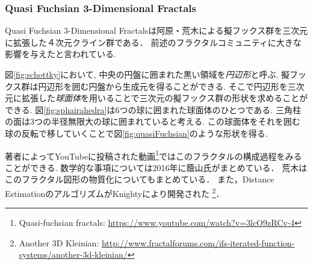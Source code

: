 \subsubsection{Quasi Fuchsian 3-Dimensional Fractals}

Quasi Fuchsian 3-Dimensional Fractalsは阿原・荒木による擬フックス群を三次元に拡張した４次元クライン群である\cite{sphairahedra}\cite{sphairahedraJa}．
前述のフラクタルコミュニティに大きな影響を与えたと言われている.

図\ref{fig:schottky}において, 中央の円盤に囲まれた黒い領域を\emph{円辺形}と呼ぶ.
擬フックス群は円辺形を囲む円盤から生成元を得ることができる.
そこで円辺形を三次元に拡張した\emph{球面体}を用いることで三次元の擬フックス群の形状を求めることができる.
図\ref{fig:sphairahedra}は6つの球に囲まれた球面体のひとつである.
三角柱の面は3つの半径無限大の球に囲まれていると考える.
この球面体をそれを囲む球の反転で移していくことで図\ref{fig:quasiFuchsian}のような形状を得る.

著者によってYouTubeに投稿された動画\footnote{Quasi-fuchsian fractals: \url{https://www.youtube.com/watch?v=3lcO9zRCv-4}}ではこのフラクタルの構成過程をみることができる.
数学的な事項については2016年に蔭山氏がまとめている\cite{kageyama}．
荒木はこのフラクタル図形の物質化についてもまとめている\cite{materializing}．
また，Distance EstimationのアルゴリズムがKnightyにより開発された
\footnote{Another 3D Kleinian:
 \url{http://www.fractalforums.com/ifs-iterated-function-systems/another-3d-kleinian/}}．

